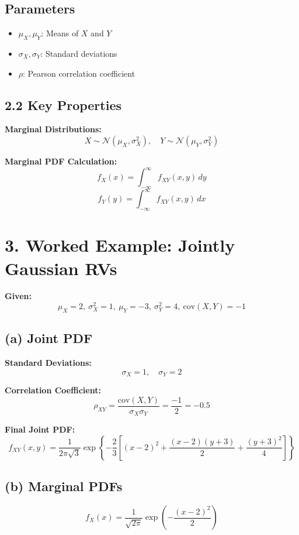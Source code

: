 \documentclass[12pt]{article}
\begin{document}
\subsection*{Parameters}
\begin{itemize}
    \item $\mu_X, \mu_Y$: Means of $X$ and $Y$
    \item $\sigma_X, \sigma_Y$: Standard deviations
    \item $\rho$: Pearson correlation coefficient
\end{itemize}

\subsection*{2.2 Key Properties}

\textbf{Marginal Distributions:}
\[
X \sim \mathcal{N}(\mu_X, \sigma_X^2), \quad
Y \sim \mathcal{N}(\mu_Y, \sigma_Y^2)
\]

\textbf{Marginal PDF Calculation:}
\[
f_X(x) = \int_{-\infty}^{\infty} f_{XY}(x,y)\,dy
\]
\[
f_Y(y) = \int_{-\infty}^{\infty} f_{XY}(x,y)\,dx
\]

\section*{3. Worked Example: Jointly Gaussian RVs}

\textbf{Given:}
\[
\mu_X = 2,\ \sigma_X^2 = 1,\ \mu_Y = -3,\ \sigma_Y^2 = 4,\ \text{cov}(X,Y) = -1
\]

\subsection*{(a) Joint PDF}

\textbf{Standard Deviations:}
\[
\sigma_X = 1,\quad \sigma_Y = 2
\]

\textbf{Correlation Coefficient:}
\[
\rho_{XY} = \frac{\text{cov}(X,Y)}{\sigma_X \sigma_Y} = \frac{-1}{2} = -0.5
\]

\textbf{Final Joint PDF:}
\[
f_{XY}(x,y) =
\frac{1}{2\pi\sqrt{3}}
\exp\left\{
-\frac{2}{3}
\left[
(x-2)^2 +
\frac{(x-2)(y+3)}{2} +
\frac{(y+3)^2}{4}
\right]
\right\}
\]

\subsection*{(b) Marginal PDFs}

\[
f_X(x) =
\frac{1}{\sqrt{2\pi}}
\exp\left(
-\frac{(x-2)^2}{2}
\right)
\]
\end{document}

